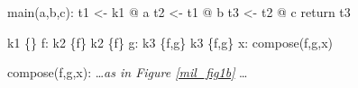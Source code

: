 \begin{minipage}{5in}%
\begin{center}%
\begin{minipage}{4in}%
\begin{AVerb}[numbers=left]
main(a,b,c): \label{mil_main_fig2}
  t1 <- k1 @ a \label{mil_t1_fig2}
  t2 <- t1 @ b \label{mil_t2_fig2}
  t3 <- t2 @ c \label{mil_t3_fig2}
  return t3

k1 \{\} f: k2 \{f\} \label{mil_k1_fig2}
k2 \{f\} g: k3 \{f,g\} \label{mil_k2_fig2}
k3 \{f,g\} x: compose(f,g,x) \label{mil_k3_fig2}

compose(f,g,x): \dots {\rm\emph{as in Figure \ref{mil_fig1b}}} \dots 
\end{AVerb}
\end{minipage}%
\end{center}%
\end{minipage}%
